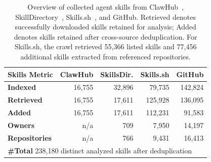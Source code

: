 \begin{table}[t]
\setlength{\tabcolsep}{3pt}
\caption{Overview of collected agent skills from ClawHub~\cite{steinberger:2026:clawhub}, SkillDirectory~\cite{skilldirectory}, Skills.sh~\cite{skills_sh}, and GitHub. Retrieved denotes successfully downloaded skills retained for analysis; Added denotes skills retained after cross-source deduplication. For Skills.sh, the crawl retrieved 55{,}366 listed skills and 77{,}456 additional skills extracted from referenced repositories.}
\label{tab:clawhub_overview}
\centering
\begin{tabularx}{\linewidth}{Xrrrr}
\toprule
\textbf{Skills Metric} & \textbf{ClawHub} & \textbf{SkillsDir.} & \textbf{Skills.sh} & \textbf{GitHub} \\
\midrule
\textbf{Indexed}
& 16{,}755
& 32{,}896
& 79{,}735
& 142{,}824
\\
\textbf{Retrieved}
& 16{,}755
& 17{,}611
& 125{,}928
& 136{,}095
\\
\textbf{Added}
& 16{,}755
& 17{,}611
& 112{,}231
& 91{,}583
\\\addlinespace
\textbf{Owners}
& n/a
& 709
& 7{,}950
& 14{,}197
\\
\textbf{Repositories}
& n/a
& 766
& 9{,}431
& 16{,}413
\\
\midrule
\multicolumn{5}{l}{\textbf{\#Total} 238{,}180 distinct analyzed skills after deduplication} \\
\bottomrule
\end{tabularx}
\end{table}
